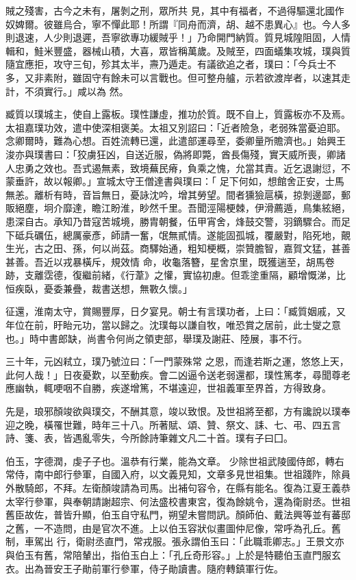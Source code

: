 \begin{pinyinscope}
 賊之殘害，古今之未有，屠剝之刑，眾所共
 見，其中有福者，不過得驅還北國作奴婢爾。彼雖烏合，寧不憚此耶！所謂『同舟而濟，胡、越不患異心』也。今人多則退速，人少則退遲，吾寧欲專功緩賊乎！」乃命開門納質。質見城隍阻固，人情輯和，鮭米豐盛，器械山積，大喜，眾皆稱萬歲。及賊至，四面蟻集攻城，璞與質隨宜應拒，攻守三旬，殄其太半，燾乃遁走。有議欲追之者，璞曰：「今兵士不多，又非素附，雖固守有餘未可以言戰也。但可整舟艫，示若欲渡岸者，以速其走計，不須實行。」咸以為
 然。



 臧質以璞城主，使自上露板。璞性謙虛，推功於質。既不自上，質露板亦不及焉。太祖嘉璞功效，遣中使深相褒美。太祖又別詔曰：「近者險急，老弱殊當憂迫耶。念卿爾時，難為心想。百姓流轉已還，此遣部運尋至，委卿量所贍濟也。」始興王浚亦與璞書曰：「狡虜狂凶，自送近服，偽將即斃，酋長傷殘，實天威所喪，卿諸人忠勇之效也。吾式遏無素，致境蕪民瘠，負乘之愧，允當其責。近乞退謝愆，不蒙垂許，故以報卿。」宣城太守王僧達書與璞曰：「
 足下何如，想館舍正安，士馬無恙。離析有時，音旨無日，憂詠沈吟，增其勞望。間者獯獫扈橫，掠剝邊鄙，郵販絕塵，坰介靡達，瞻江盼淮，眇然千里。吾聞涇陽梗棘，伊滑薦遁，鳥集絃絕，患深自古。承知乃昔寇苦城境，勝胄朝餐，伍甲宵舍，烽鼓交警，羽鏑驟合。而足下砥兵礪伍，總厲豪彥，師請一奮，氓無貳情。遂能固孤城，覆嚴對，陷死地，覿生光，古之田、孫，何以尚茲。商驛始通，粗知梗概，崇贊膽智，嘉賀文猛，甚善甚善。吾近以戎暴橫斥，規效情
 命，收龜落簪，星舍京里，既獲遄至，胡馬卷跡，支離霑德，復繼前緒，《行葦》之懽，實協初慮。但乖塗重隔，顧增慨涕，比恒疾臥，憂委兼疊，裁書送想，無斁久懷。」


征還，淮南太守，賞賜豐厚，日夕宴見。朝士有言璞功者，上曰：「臧質姻戚，又年位在前，盱眙元功，當以歸之。沈璞每以謙自牧，唯恐賞之居前，此士燮之意也。」時中書郎缺，尚書令何尚之領吏部，舉璞及謝莊、陸展，事不行。



 三十年，元凶弒立，璞乃號泣曰：「一門蒙殊常
 之恩，而逢若斯之運，悠悠上天，此何人哉！」日夜憂歎，以至動疾。會二凶逼令送老弱還都，璞性篤孝，尋聞尊老應幽執，輒哽咽不自勝，疾遂增篤，不堪遠迎，世祖義軍至界首，方得致身。



 先是，琅邪顏竣欲與璞交，不酬其意，竣以致恨。及世祖將至都，方有讒說以璞奉迎之晚，橫罹世難，時年三十八。所著賦、頌、贊、祭文、誄、七、弔、四五言詩、箋、表，皆遇亂零失，今所餘詩筆雜文凡二十首。璞有子曰囗。



 伯玉，字德潤，虔子子也。溫恭有行業，能為文章。
 少除世祖武陵國侍郎，轉右常侍，南中郎行參軍，自國入府，以文義見知，文章多見世祖集。世祖踐阼，除員外散騎郎，不拜。左衛顏竣請為司馬。出補句容令，在縣有能名。復為江夏王義恭太宰行參軍，與奉朝請謝超宗、何法盛校書東宮，復為餘姚令，還為衛尉丞。世祖舊臣故佐，普皆升顯，伯玉自守私門，朔望未嘗問訊。顏師伯、戴法興等並有蕃邸之舊，一不造問，由是官次不進。上以伯玉容狀似畫圖仲尼像，常呼為孔丘。舊制，車駕出
 行，衛尉丞直門，常戎服。張永謂伯玉曰：「此職乖卿志。」王景文亦與伯玉有舊，常陪輦出，指伯玉白上：「孔丘奇形容。」上於是特聽伯玉直門服玄衣。出為晉安王子勛前軍行參軍，侍子勛讀書。隨府轉鎮軍行佐。




\end{pinyinscope}
